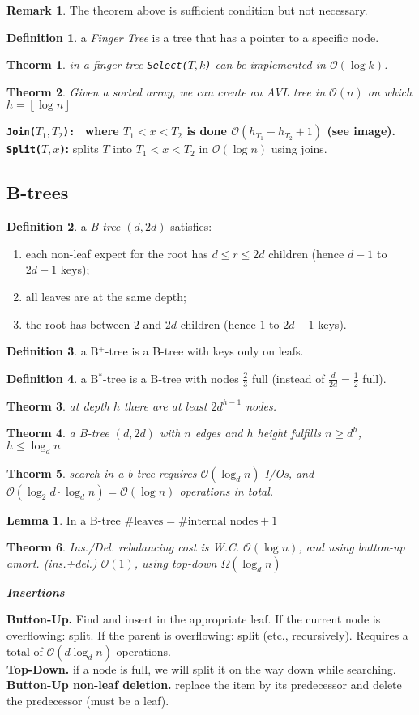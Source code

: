 \documentclass[]{article}
\newcommand\compactsubsection[1]        {\vspace{-10pt}\subsection{#1}\vspace{-5pt}}
\newcommand\oc    {\mathcal{O}}
\newcommand\rf    {\right\rfloor}
\newcommand\lf    {\left\lfloor}
\newcommand\floor [1] {\lf #1 \rf}
\newcommand\logn      {\log n}
\newtheorem{Theorem}{Theorm}
\theoremstyle{definition}
\newtheorem{Definition}{Definition}
\newtheorem{Lemma}{Lemma}
\newtheorem{Remark}{Remark}
\newcommand\theo  [1] {\begin{Theorem}#1\end{Theorem}}
\newcommand\defi  [1] {\begin{Definition}#1\end{Definition}}
\newcommand\lem   [1] {\begin{Lemma}#1\end{Lemma}}
\begin{document}
\begin{multicols}{4}
				\begin{Remark}
					The theorem above is sufficient condition but not necessary. 
				\end{Remark}
				
				\defi{a \textit{Finger Tree} is a tree that has a pointer to a specific node. }
				\theo{in a finger tree \texttt{Select($T, k$)} can be implemented in $\oc(\log k)$. }
				\theo{Given a sorted array, we can create an AVL tree in $\oc(n)$ on which $h = \floor{\logn}$}
				\textbf{\texttt{Join($T_1, T_2$): } where $T_1 < x < T_2$ is done $\oc(h_{T_1} + h_{T_2} + 1)$ (see image). }
				\textbf{\texttt{Split($T, x$)}: }splits $T$ into $T_1 < x < T_2$ in $\oc(\logn)$ using joins. 
			
			\compactsubsection{B-trees}		
				\defi{a \textit{B-tree $(d, 2d)$} satisfies: 
				\begin{enumerate}
					\item each non-leaf expect for the root has $d \le r \le 2d$ children (hence $d - 1$ to $2d - 1$ keys);
					\item all leaves are at the same depth;
					\item the root has between $2$ and $2d$ children (hence $1$ to $2d - 1$ keys). 
				\end{enumerate}}
				\defi{a B$^{\text{+}}$-tree is a B-tree with keys only on leafs. }
				\defi{a B$^{\text{*}}$-tree is a B-tree with nodes $\frac{2}{3}$ full (instead of $\frac{d}{2d} = \frac{1}{2}$ full). }
				\theo{at depth $h$ there are at least $2d^{h - 1}$ nodes. }
				\theo{a B-tree $(d, 2d)$ with $n$ edges and $h$ height fulfills $n \ge d^{h}$, $h \le \log_{d} n$}
				\theo{search in a b-tree requires $\oc(\log_dn)$ I/Os, and $\oc(\log_2 d \cdot \log_d n) = \oc(\logn)$ operations in total. }
				\lem{In a B-tree $\# \text{leaves} = \# \text{internal nodes} + 1$}
				
				\theo{Ins./Del. rebalancing cost is W.C. $\oc(\logn)$, and using button-up amort. (ins.+del.) $\oc(1)$, using top-down $\Omega(\log_dn)$}
				
				\quad\textbf{\textit{Insertions}}
				
					\textbf{Button-Up. }Find and insert in the appropriate leaf. If the current node is overflowing: split. If the parent is overflowing: split (etc., recursively). Requires a total of $\oc(d \log_dn)$ operations. \\
					\textbf{Top-Down. }if a node is full, we will split it on the way down while searching. \\
					\textbf{Button-Up non-leaf deletion. }replace the item by its predecessor and delete the predecessor (must be a leaf). 
				

\end{multicols}
\end{document}
